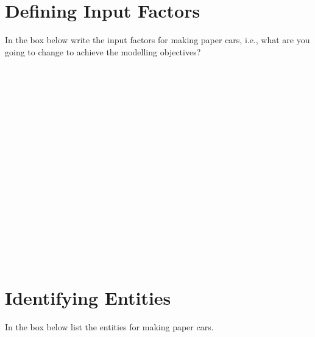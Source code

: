 \documentclass[
  10pt,
  a4paperpaper,
  DIV=11,
  numbers=noendperiod,
  oneside]{scrreprt}
\begin{document}
\begin{figure}

\begin{mdframed}[innerbottommargin=4.5cm]

~

~

~

~

~

~

~

~

~

~

\end{mdframed}

\end{figure}%

\newpage{}

\section{Defining Input Factors}\label{defining-input-factors-1}

In the box below write the input factors for making paper cars, i.e.,
what are you going to change to achieve the modelling objectives?

\begin{figure}

\begin{mdframed}[innerbottommargin=4.5cm]

~

~

~

~

~

~

~

~

~

~

\end{mdframed}

\end{figure}%

\section{Identifying Entities}\label{identifying-entities-1}

In the box below list the entities for making paper cars.

\begin{figure}

\begin{mdframed}[innerbottommargin=4.5cm]

~

~

~

~

~

~

~

~

~

~

\end{mdframed}

\end{figure}%
\end{document}

